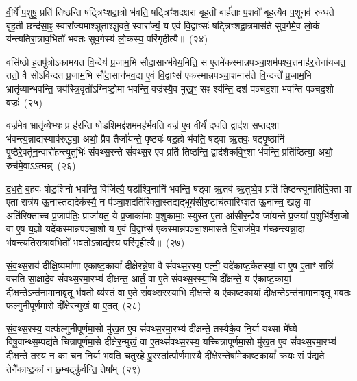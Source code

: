 वी॒र्ये॑ प॒शुषु॒ प्रति॑ तिष्ठन्ति षट्त्रिꣳशद्रा॒त्रो भ॑वति॒ षट्त्रिꣳ॑शदक्षरा बृह॒ती बार्\mbox{}ह॑ताः प॒शवो॑ बृह॒त्यैव प॒शूनव॑ रुन्धते बृह॒ती छन्द॑सा॒ꣴ॒ स्वारा᳚ज्यमाश्ञुताश्ञु॒वते॒ स्वारा᳚ज्यं॒ य ए॒वं वि॒द्वाꣳसः॑ षट्त्रिꣳशद्रा॒त्रमास॑ते सुव॒र्गमे॒व लो॒कं य॑न्त्यतिरा॒त्राव॒भितो॑ भवतः सुव॒र्गस्य॑ लो॒कस्य॒ परि॑गृहीत्यै॥~(२४)\ip

{\anuvakamend[{अ॒ति॒रा॒त्र ओज॑स्ये॒व षट्त्रिꣳ॑शच्च}]}

वसि॑ष्ठो ह॒तपु॑त्रो\-ऽकामयत वि॒न्देय॑ प्र॒जाम॒भि सौ॑दा॒सान्भ॑वेय॒मिति॒ स ए॒तमे॑कस्मान्नपञ्चा॒शम॑पश्य॒त्तमाह॑र॒त्तेना॑यजत॒ ततो॒ वै सो\-ऽवि॑न्दत प्र॒जाम॒भि सौ॑दा॒सान॑भव॒द्य ए॒वं वि॒द्वाꣳस॑ एकस्मान्नपञ्चा॒शमास॑ते वि॒न्दन्ते᳚ प्र॒जाम॒भि भ्रातृ॑व्यान्भवन्ति॒ त्रय॑स्त्रि॒वृतो᳚\-ऽग्निष्टो॒मा भ॑वन्ति॒ वज्र॑स्यै॒व मुख॒ꣳ॒ सꣴ श्य॑न्ति॒ दश॑ पञ्चद॒शा भ॑वन्ति पञ्चद॒शो वज्रः॑~(२५)\ip

वज्र॑मे॒व भ्रातृ॑व्येभ्यः॒ प्र ह॑रन्ति षोडशि॒मद्द॑श॒ममह॑र्भवति॒ वज्र॑ ए॒व वी॒र्यं॑ दधति॒ द्वाद॑श सप्तद॒शा भ॑वन्त्य॒न्नाद्य॒स्याव॑रुद्ध्या॒ अथो॒ प्रैव तैर्जा॑यन्ते॒ पृष्ठ्यः॑ षड॒हो भ॑वति॒ षड्वा ऋ॒तवः॒ षट्पृ॒ष्ठानि॑ पृ॒ष्ठैरे॒वर्तून॒न्वारो॑हन्त्यृ॒तुभिः॑ संवथ्स॒रन्ते सं॑वथ्स॒र ए॒व प्रति॑ तिष्ठन्ति॒ द्वाद॑शैकवि॒ꣳ॒शा भ॑वन्ति॒ प्रति॑ष्ठित्या॒ अथो॒ रुच॑मे॒वा\-ऽऽ\-त्मन्न्~(२६)\ip

द॒ध॒ते॒ ब॒हवः॑ षोड॒शिनो॑ भवन्ति॒ विजि॑त्यै॒ षडा᳚श्वि॒नानि॑ भवन्ति॒ षड्वा ऋ॒तव॑ ऋ॒तुष्वे॒व प्रति॑ तिष्ठन्त्यूनातिरि॒क्ता वा ए॒ता रात्र॑य ऊ॒नास्तद्यदेक॑स्यै॒ न प॑ञ्चा॒शदति॑रिक्ता॒स्तद्यद्भूय॑सीर॒ष्टाच॑त्वारिꣳशत ऊ॒नाच्च॒ खलु॒ वा अति॑रिक्ताच्च प्र॒जा\-प॑तिः॒ प्राजा॑यत॒ ये प्र॒जाका॑माः प॒शुका॑माः॒ स्युस्त ए॒ता आ॑सीर॒न्प्रैव जा॑यन्ते प्र॒जया॑ प॒शुभि॑र्वैरा॒जो वा ए॒ष य॒ज्ञो यदे॑कस्मान्नपञ्चा॒शो य ए॒वं वि॒द्वाꣳस॑ एकस्मान्नपञ्चा॒शमास॑ते वि॒राज॑मे॒व ग॑च्छन्त्यन्ना॒दा भ॑वन्त्यतिरा॒त्राव॒भितो॑ भवतो॒\-ऽन्नाद्य॑स्य॒ परि॑गृहीत्यै॥~(२७)\ip

{\anuvakamend[{वज्र॑ आ॒त्मन्प्र॒जया॒ द्वाविꣳ॑शतिश्च}]}

सं॒व॒थ्स॒राय॑ दीक्षि॒ष्यमा॑णा एकाष्ट॒कायां᳚ दीक्षेरन्ने॒षा वै सं॑वथ्स॒रस्य॒ पत्नी॒ यदे॑काष्ट॒कैतस्यां॒ वा ए॒ष ए॒ताꣳ रात्रिं॑ वसति सा॒क्षादे॒व सं॑वथ्स॒रमा॒रभ्य॑ दीक्षन्त॒ आर्तं॒ वा ए॒ते सं॑वथ्स॒रस्या॒भि दी᳚क्षन्ते॒ य ए॑काष्ट॒कायां॒ दीक्ष॒न्ते\-ऽन्त॑नामानावृ॒तू भ॑वतो॒ व्य॑स्तं॒ वा ए॒ते सं॑वथ्स॒रस्या॒भि दी᳚क्षन्ते॒ य ए॑काष्ट॒कायां॒ दीक्ष॒न्ते\-ऽन्त॑नामानावृ॒तू भ॑वतः फल्गुनीपूर्णमा॒से दी᳚क्षेर॒न्मुखं॒ वा ए॒तत्~(२८)\ip

सं॒व॒थ्स॒रस्य॒ यत्फ॑ल्गुनीपूर्णमा॒सो मु॑ख॒त ए॒व सं॑वथ्स॒रमा॒रभ्य॑ दीक्षन्ते॒ तस्यैकै॒व नि॒र्या यथ्सां मे᳚घ्ये विषू॒वान्थ्स॒म्पद्य॑ते चित्रापूर्णमा॒से दी᳚क्षेर॒न्मुखं॒ वा ए॒तथ्सं॑वथ्स॒रस्य॒ यच्चि॑त्रापूर्णमा॒सो मु॑ख॒त ए॒व सं॑वथ्स॒रमा॒रभ्य॑ दीक्षन्ते॒ तस्य॒ न का च॒न नि॒र्या भ॑वति चतुर॒हे पु॒रस्ता᳚त्पौर्णमा॒स्यै दी᳚क्षेर॒न्तेषा॑मेकाष्ट॒कायां᳚ क्र॒यः सं प॑द्यते॒ तेनै॑काष्ट॒कां न छ॒म्बट्कु॑र्वन्ति॒ तेषा᳚म्~(२९)\ip

